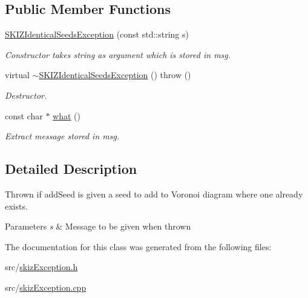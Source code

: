 \subsection*{Public Member Functions}
\begin{DoxyCompactItemize}
\item 
\mbox{\label{classSKIZIdenticalSeedsException_a776554e938f17373b9de355c81eb78e3}} 
\mbox{\hyperlink{classSKIZIdenticalSeedsException_a776554e938f17373b9de355c81eb78e3}{S\+K\+I\+Z\+Identical\+Seeds\+Exception}} (const std\+::string s)
\begin{DoxyCompactList}\small\item\em Constructor takes string as argument which is stored in msg. \end{DoxyCompactList}\item 
\mbox{\label{classSKIZIdenticalSeedsException_addce88717ce4fe89ef5d431e7fdff84b}} 
virtual \mbox{\hyperlink{classSKIZIdenticalSeedsException_addce88717ce4fe89ef5d431e7fdff84b}{$\sim$\+S\+K\+I\+Z\+Identical\+Seeds\+Exception}} ()  throw ()
\begin{DoxyCompactList}\small\item\em Destructor. \end{DoxyCompactList}\item 
\mbox{\label{classSKIZIdenticalSeedsException_a1edd2deac7bafc875e21c67d114494ae}} 
const char $\ast$ \mbox{\hyperlink{classSKIZIdenticalSeedsException_a1edd2deac7bafc875e21c67d114494ae}{what}} ()
\begin{DoxyCompactList}\small\item\em Extract message stored in msg. \end{DoxyCompactList}\end{DoxyCompactItemize}


\subsection{Detailed Description}
Thrown if add\+Seed is given a seed to add to Voronoi diagram where one already exists. 


\begin{DoxyParams}{Parameters}
{\em s} & Message to be given when thrown \\
\hline
\end{DoxyParams}


The documentation for this class was generated from the following files\+:\begin{DoxyCompactItemize}
\item 
src/\mbox{\hyperlink{skizException_8h}{skiz\+Exception.\+h}}\item 
src/\mbox{\hyperlink{skizException_8cpp}{skiz\+Exception.\+cpp}}\end{DoxyCompactItemize}
